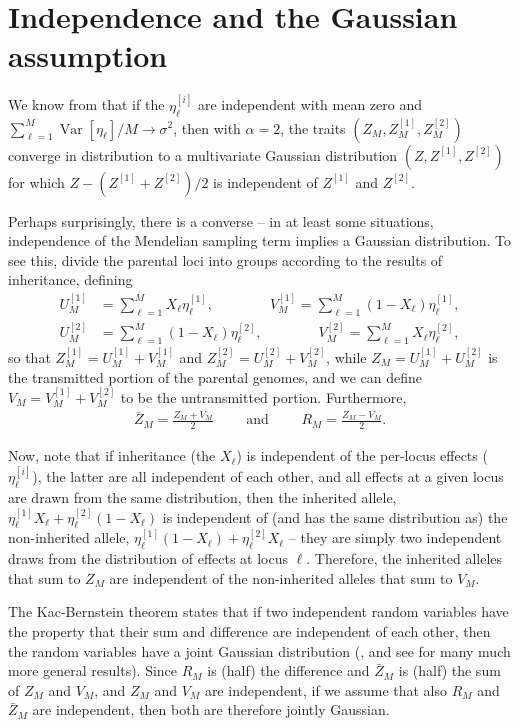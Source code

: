 \documentclass{article}
\newcommand{\var}{\mathop{\mbox{Var}}}
\newcommand{\1}{\mathbbm{1}}
\theoremstyle{remark}
\theoremstyle{definition}
\begin{document}
\section{Independence and the Gaussian assumption}

We know from \citet{barton2017infinitesimal} that if the $\eta^{[i]}_\ell$ are
independent with mean zero and $\sum_{\ell=1}^M \var[\eta_\ell]/M \to \sigma^2$,
then with $\alpha=2$,
the traits $(Z_M, Z_M^{[1]}, Z_M^{[2]})$ converge in distribution to a multivariate Gaussian distribution
$(Z, Z^{[1]}, Z^{[2]})$ for which $Z - (Z^{[1]} + Z^{[2]})/2$ is independent of $Z^{[1]}$ and $Z^{[2]}$.

Perhaps surprisingly, there is a converse --
in at least some situations,
independence of the Mendelian sampling term implies a Gaussian distribution.
To see this,
divide the parental loci into groups according to the results of inheritance,
defining
\begin{align*}
    U_M^{[1]} &= \sum_{\ell=1}^M X_\ell \eta_\ell^{[1]}  ,
    \qquad \qquad
    V_M^{[1]} = \sum_{\ell=1}^M (1-X_\ell) \eta_\ell^{[1]} ,  \\
    U_M^{[2]} &= \sum_{\ell=1}^M (1-X_\ell) \eta_\ell^{[2]} ,
    \qquad \qquad
    V_M^{[2]} = \sum_{\ell=1}^M X_\ell \eta_\ell^{[2]}  ,
\end{align*}
so that 
$Z_M^{[1]} = U_M^{[1]} + V_M^{[1]}$ and
$Z_M^{[2]} = U_M^{[2]} + V_M^{[2]}$, while
$Z_M = U_M^{[1]} + U_M^{[2]}$ is the transmitted portion of the parental genomes,
and we can define $V_M = V_M^{[1]} + V_M^{[2]}$ to be the untransmitted portion.
Furthermore,
\begin{align*}
    \bar Z_M = \frac{Z_M + V_M}{2}
    \qquad \text{ and } \qquad
    R_M = \frac{Z_M - V_M}{ 2 } .
\end{align*}

Now, note that if inheritance (the $X_\ell$) is independent of the per-locus effects ($\eta_\ell^{[i]}$),
the latter are all independent of each other,
and all effects at a given locus are drawn from the same distribution,
then the inherited allele, 
$\eta_\ell^{[1]} X_\ell + \eta_\ell^{[2]} (1-X_\ell)$
is independent of (and has the same distribution as)
the non-inherited allele,
$\eta_\ell^{[1]} (1-X_\ell) + \eta_\ell^{[2]} X_\ell$
-- they are simply two independent draws from the distribution of effects at locus $\ell$.
Therefore, the inherited alleles that sum to $Z_M$
are independent of the non-inherited alleles that sum to $V_M$.

The Kac-Bernstein theorem states that if two independent random variables
have the property that their sum and difference are independent of each other,
then the random variables have a joint Gaussian distribution
(\citet{kac1939characterization,bernstein1941property},
and see \citet{kagan1973characterization} for many much more general results).
Since $R_M$ is (half) the difference and $\bar Z_M$ is (half) the sum
of $Z_M$ and $V_M$, and $Z_M$ and $V_M$ are independent,
if we assume that also $R_M$ and $\bar Z_M$ are independent,
then both are therefore jointly Gaussian.
\end{document}
